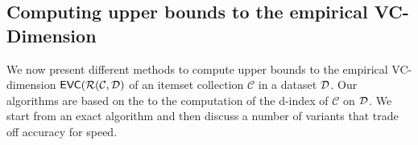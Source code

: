 
\subsection{Computing upper bounds to the empirical VC-Dimension}\label{sec:computvc}
We now present different methods to compute upper bounds to the empirical
VC-dimension $\mathsf{EVC}(\mathcal{R}(\mathcal{C},{\cal D})$ of an
itemset collection $\mathcal{C}$ in a dataset ${\cal D}$. Our algorithms are based
on the to the computation of the d-index of $\mathcal{C}$ on ${\cal D}$.
We start from an exact algorithm and then discuss a number of variants that
trade off accuracy for speed.

